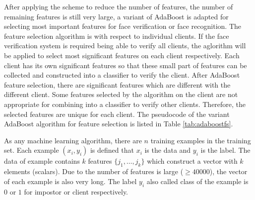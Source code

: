 After applying the scheme to reduce the number of features, the number of remaining features is still very large, a variant of AdaBoost is adapted for selecting most important features for face verification or face recognition.  The feature selection algorithm is with respect to individual clients. If the face verification system is required being able to verify all clients, the aglorithm will be applied to select most significant features on each client respectively. Each client has its own significant features so that these small part of features can be collected and constructed into a classifier to verify the client. After AdaBoost feature selection, there are significant features which are different with the different client. Some features selected by the algorithm on the client are not appropriate for combining into a classifier to verify other clients. Therefore, the selected features are unique for each client. The pseudocode of the variant AdaBoost algorithm for feature selection is listed in \mbox{Table} \ref{tab:adaboostfs}. 

As any machine learning algorithm, there are $n$ training examples in the training set. Each example $(x_{i},y_{i})$ is defined that $x_{i}$ is the data and $y_{i}$ is the label. The data of example contains $k$ features $\{j_{1},\ldots,j_{k}\}$ which construct a vector with $k$ elements (scalars). Due to the number of features is large ($\geq 40000$), the vector of each example is also very long. The label $y_{i}$ also called class of the example is $0$ or $1$ for impostor or client respectively. 

